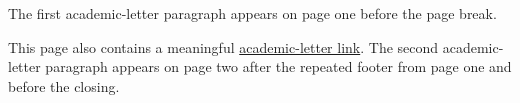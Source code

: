 \documentclass[family=academic, medium=print]{careerdossier-letter}
\begin{document}
\MakeCDossierLetterhead
The first academic-letter paragraph appears on page one before the page break.

This page also contains a meaningful
\href{https://example.test/academic-letter}{academic-letter link}.
\newpage
The second academic-letter paragraph appears on page two after the repeated
footer from page one and before the closing.
\MakeCDossierClosing
\end{document}
